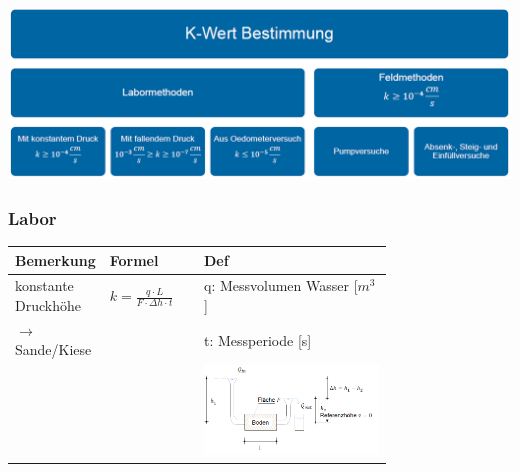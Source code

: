 \begin{minipage}{0.5\linewidth}
	\includegraphics[width=\linewidth]{images/GW4Durchlaessigkeit.PNG} \\
\end{minipage}




\begin{landscape}


\begin{minipage}{0.5\linewidth}
	\subsubsection{Labor}
	
	\begin{tabular}{p{0.25\linewidth}|l|p{0.5\linewidth}}
		Bemerkung	& Formel			&	Def	 \\ \hline
		
		konstante Druckhöhe 	&	$ k = \frac{q \cdot L}{F \cdot \Delta h \cdot t} $	& q: Messvolumen Wasser [$m^3$] \\
		$ \rightarrow $ Sande/Kiese &	& t: Messperiode [s] \\ 
					&					& \includegraphics[width=\linewidth]{images/GW3Darcy.PNG} \\ \hline
		

\end{tabular}
\end{minipage}
\end{landscape}
